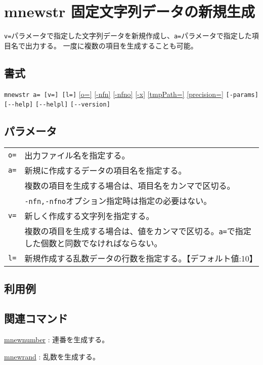
%

\section{mnewstr 固定文字列データの新規生成\label{sect:mnewstr}}
\verb|v=|パラメータで指定した文字列データを新規作成し、\verb|a=|パラメータで指定した項目名で出力する。
一度に複数の項目を生成することも可能。

\subsection*{書式}
\verb|mnewstr a= [v=] [l=]|
\hyperref[sect:option_o]{[o=]}
\hyperref[sect:option_nfn]{[-nfn]} 
\hyperref[sect:option_nfno]{[-nfno]}  
\hyperref[sect:option_x]{[-x]}
\hyperref[sect:option_option_tmppath]{[tmpPath=]}
\hyperref[sect:option_precision]{[precision=]}
\verb|[-params]|
\verb|[--help]|
\verb|[--helpl]|
\verb|[--version]|\\

\subsection*{パラメータ}
\begin{table}[htbp]
{\small
\begin{tabular}{ll}
\verb|o=|    & 出力ファイル名を指定する。\\
\verb|a=|    & 新規に作成するデータの項目名を指定する。\\
             & 複数の項目を生成する場合は、項目名をカンマで区切る。\\
             & \verb|-nfn,-nfno|オプション指定時は指定の必要はない。\\
\verb|v=|    & 新しく作成する文字列を指定する。\\
             & 複数の項目を生成する場合は、値をカンマで区切る。\verb|a=|で指定した個数と同数でなければならない。\\
\verb|l=|    & 新規作成する乱数データの行数を指定する。【デフォルト値:10】\\
\end{tabular} 
}
\end{table} 


\subsection*{利用例}

\subsection*{関連コマンド}
\hyperref[sect:mnewnumber] {mnewnumber} : 連番を生成する。

\hyperref[sect:mnewrand] {mnewrand} : 乱数を生成する。

%
